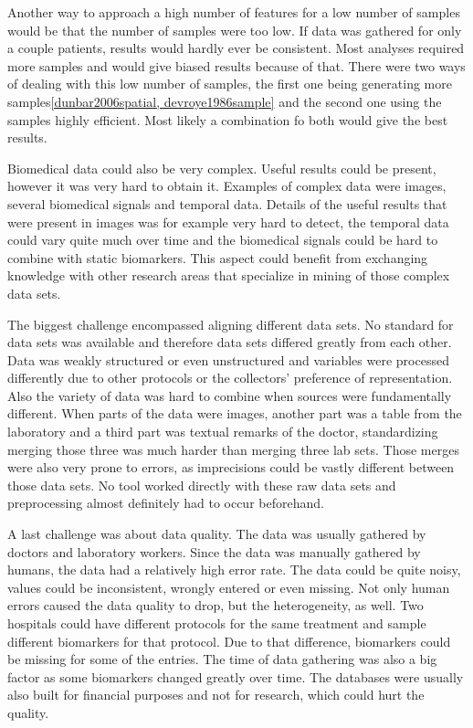 \documentclass[10pt,a4paper]{article}
\begin{document}
	Another way to approach a high number of features for a low number of samples would be that the number of samples were too low. If data was gathered for only a couple patients, results would hardly ever be consistent. Most analyses required more samples and would give biased results because of that. There were two ways of dealing with this low number of samples, the first one being generating more samples\ref{dunbar2006spatial, devroye1986sample} and the second one using the samples highly efficient\cite{van2002gene, roff1989statistical}. Most likely a combination fo both would give the best results. 
	
	Biomedical data could also be very complex. Useful results could be present, however it was very hard to obtain it. Examples of complex data were images, several biomedical signals and temporal data. Details of the useful results that were present in images was for example very hard to detect, the temporal data could vary quite much over time and the biomedical signals could be hard to combine with static biomarkers.\cite{Yoo2012} This aspect could benefit from exchanging knowledge with other research areas that specialize in mining of those complex data sets.\cite{Turkay2014, bellazzi2011data}
	
	The biggest challenge encompassed aligning different data sets. No standard for data sets was available and therefore data sets differed greatly from each other. Data was weakly structured or even unstructured\cite{Holzinger2014} and variables were processed differently due to other protocols or the collectors' preference of representation.\cite{Otasek2014} Also the variety of data was hard to combine when sources were fundamentally different. When parts of the data were images, another part was a table from the laboratory and a third part was textual remarks of the doctor, standardizing merging those three was much harder than merging three lab sets. Those merges were also very prone to errors, as imprecisions could be vastly different between those data sets. No tool worked directly with these raw data sets and preprocessing almost definitely had to occur beforehand.\cite{CIOS20021, Turkay2014}
	
	A last challenge was about data quality. The data was usually gathered by doctors and laboratory workers. Since the data was manually gathered by humans, the data had a relatively high error rate. The data could be quite noisy, values could be inconsistent, wrongly entered or even missing.\cite{CIOS20021} Not only human errors caused the data quality to drop, but the heterogeneity, as well. Two hospitals could have different protocols for the same treatment and sample different biomarkers for that protocol. Due to that difference, biomarkers could be missing for some of the entries. The time of data gathering was also a big factor as some biomarkers changed greatly over time. The databases were usually also built for financial purposes and not for research, which could hurt the quality.\cite{Yoo2012}
	
\end{document}
